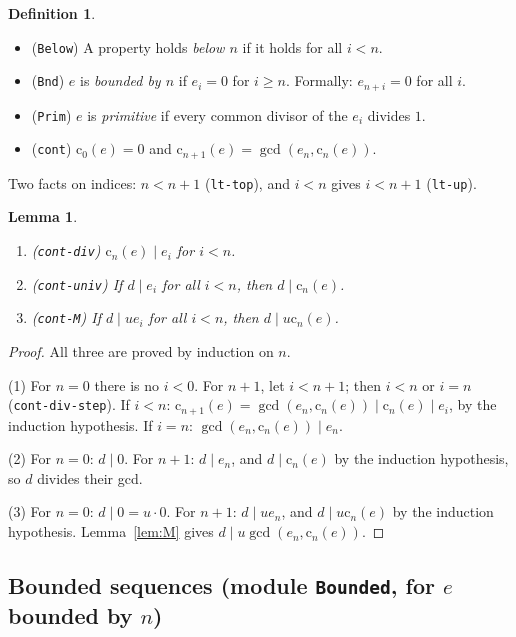 \documentclass[11pt]{amsart}
\newtheorem{lemma}[theorem]{Lemma}
\theoremstyle{definition}
\newtheorem{definition}[theorem]{Definition}
\theoremstyle{remark}
\newcommand{\nm}[1]{\textup{\texttt{#1}}}
\newcommand{\cont}{\mathrm{c}}
\newcommand{\gcdd}{\operatorname{gcd}}
\begin{document}
\begin{definition}
\begin{itemize}
\item (\nm{Below}) A property holds \emph{below $n$} if it holds for all
  $i<n$.
\item (\nm{Bnd}) $e$ is \emph{bounded by $n$} if $e_i = 0$ for $i\ge n$.
  Formally: $e_{n+i}=0$ for all $i$.
\item (\nm{Prim}) $e$ is \emph{primitive} if every common divisor of the
  $e_i$ divides $1$.
\item (\nm{cont}) $\cont_0(e) = 0$ and
  $\cont_{n+1}(e) = \gcdd(e_n, \cont_n(e))$.
\end{itemize}
\end{definition}

\noindent Two facts on indices: $n<n+1$ (\nm{lt-top}), and $i<n$ gives
$i<n+1$ (\nm{lt-up}).

\begin{lemma}\label{lem:cont}
\begin{enumerate}
\item (\nm{cont-div}) $\cont_n(e)\mid e_i$ for $i<n$.
\item (\nm{cont-univ}) If $d\mid e_i$ for all $i<n$, then
  $d\mid\cont_n(e)$.
\item (\nm{cont-M}) If $d\mid ue_i$ for all $i<n$, then
  $d\mid u\cont_n(e)$.
\end{enumerate}
\end{lemma}
\begin{proof}
All three are proved by induction on $n$.

(1) For $n=0$ there is no $i<0$. For $n+1$, let $i<n+1$; then $i<n$ or
$i=n$ (\nm{cont-div-step}). If $i<n$:
$\cont_{n+1}(e) = \gcdd(e_n,\cont_n(e))\mid\cont_n(e)\mid e_i$, by the
induction hypothesis. If $i=n$: $\gcdd(e_n,\cont_n(e))\mid e_n$.

(2) For $n=0$: $d\mid0$. For $n+1$: $d\mid e_n$, and $d\mid\cont_n(e)$
by the induction hypothesis, so $d$ divides their gcd.

(3) For $n=0$: $d\mid0 = u\cdot0$. For $n+1$: $d\mid ue_n$, and
$d\mid u\cont_n(e)$ by the induction hypothesis. Lemma~\ref{lem:M} gives
$d\mid u\gcdd(e_n,\cont_n(e))$.
\end{proof}

\subsection{Bounded sequences (module \nm{Bounded}, for $e$ bounded by
$n$)}
\end{document}
